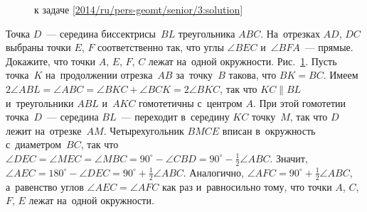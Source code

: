 \ifsolution
\begin{figure}\centering
    \caption{к задаче \ref{2014/ru/pers-geomt/senior/3:solution}}
    \label{2014/ru/pers-geomt/senior/3:solution:fig}
\end{figure}%
\fi %

\problem
Точка $D$~--- середина биссектрисы~$BL$ треугольника $ABC$.
На~отрезках $AD$, $DC$ выбраны точки $E$, $F$ соответственно так, что углы
$\angle BEC$ и~$\angle BFA$~--- прямые.
Докажите, что точки $A$, $E$, $F$, $C$ лежат на~одной окружности.
\solution
\label{2014/ru/pers-geomt/senior/3:solution}%
Рис.~\ref{2014/ru/pers-geomt/senior/3:solution:fig}.
Пусть точка~$K$ на~продолжении отрезка~$AB$ за~точку~$B$ такова, что $BK = BC$.
Имеем $2 \angle ABL = \angle ABC = \angle BKC + \angle BCK = 2 \angle BKC$, так
что $KC \parallel BL$ и~треугольники $ABL$ и~$AKC$ гомотетичны с~центром $A$.
При этой гомотетии точка~$D$~--- середина $BL$~--- переходит в~середину $KC$
точку~$M$, так что $D$ лежит на~отрезке~$AM$.
Четырехугольник $BMCE$ вписан в~окружность с~диаметром~$BC$, так что
\(
    \angle DEC = \angle MEC = \angle MBC
=
    90^{\circ} - \angle CBD = 90^{\circ} - \frac{1}{2} \angle ABC
\).
Значит,
$\angle AEC = 180^{\circ} - \angle DEC = 90^{\circ} + \frac{1}{2} \angle ABC$.
Аналогично, $\angle AFC = 90^{\circ} + \frac{1}{2} \angle ABC$,
а~равенство углов $\angle AEC = \angle AFC$ как раз и~равносильно тому, что
точки $A$, $C$, $F$, $E$ лежат на~одной окружности.
\endproblem
